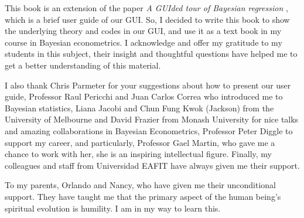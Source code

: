 This book is an extension of the paper \textit{A GUIded tour of Bayesian regression} \citep{Ramirez2020}, which is a brief user guide of our GUI. So, I decided to write this book to show the underlying theory and codes in our GUI, and use it as a text book in my course in Bayesian econometrics. I acknowledge and offer my gratitude to my students in this subject, their insight and thoughtful questions have helped me to get a better understanding of this material.   

I also thank Chris Parmeter for your suggestions about how to present our user guide, Professor Raul Pericchi and Juan Carlos Correa who introduced me to Bayesian statistics, Liana Jacobi and Chun Fung Kwok (Jackson) from the University of Melbourne and David Frazier from Monash University for nice talks and amazing collaborations in Bayesian Econometrics, Professor Peter Diggle to support my career, and particularly, Professor Gael Martin, who gave me a chance to work with her, she is an inspiring intellectual figure. Finally, my colleagues and staff from Universidad EAFIT have always given me their support.

To my parents, Orlando and Nancy, who have given me their unconditional support. They have taught me that the primary aspect of the human being's spiritual evolution is humility. I am in my way to learn this.


